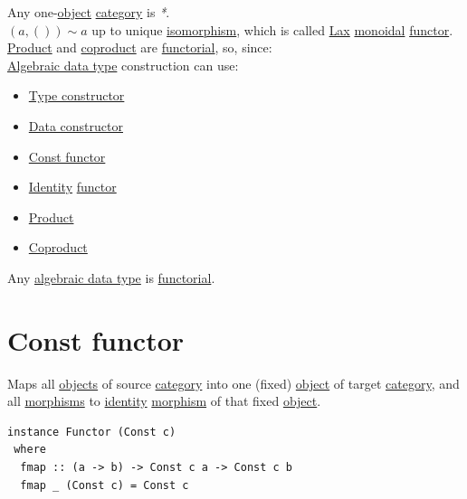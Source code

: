 \documentclass[a4paper,14pt,oneside]{book}
\begin{document}
Any one-\hyperref[org5771609]{object} \hyperref[org841d8bc]{category} is \emph{*}.\\

\((a, ()) \sim a\) up to unique \hyperref[org1fa9882]{isomorphism}, which is called \hyperref[orgbde767d]{Lax} \hyperref[org94afd7a]{monoidal} \hyperref[orge5e236e]{functor}.\\

\hyperref[org7331b6a]{Product} and \hyperref[orge94759d]{coproduct} are \hyperref[orgfc7d910]{functorial}, so, since:\\
\hyperref[org05a048b]{Algebraic data type} construction can use:\\
\begin{itemize}
\item \hyperref[orgec3c22c]{Type constructor}\\
\item \hyperref[orgb57a4f6]{Data constructor}\\
\item \hyperref[org8d88bcf]{Const functor}\\
\item \hyperref[org8140c9c]{Identity} \hyperref[orge5e236e]{functor}\\
\item \hyperref[org7331b6a]{Product}\\
\item \hyperref[orge94759d]{Coproduct}\\
\end{itemize}

Any \hyperref[org05a048b]{algebraic data type} is \hyperref[orgfc7d910]{functorial}.\\

\chapter{\label{org8d88bcf}Const functor}
\label{sec:org469f0e9}

Maps all \hyperref[org22f7883]{objects} of source \hyperref[org841d8bc]{category} into one (fixed) \hyperref[org5771609]{object} of target \hyperref[org841d8bc]{category}, and all \hyperref[org9d6b2ec]{morphisms} to \hyperref[org8140c9c]{identity} \hyperref[org2170e98]{morphism} of that fixed \hyperref[org5771609]{object}.\\

\begin{verbatim}
instance Functor (Const c)
 where
  fmap :: (a -> b) -> Const c a -> Const c b
  fmap _ (Const c) = Const c
\end{verbatim}
\end{document}
